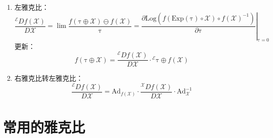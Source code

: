 \documentclass[12pt, onecolumn]{article}
\newcommand\normf{\fangsong}
\newcommand\Exp[1]{\mathrm{Exp}\left( #1\right) }
\newcommand\Log[1]{\mathrm{Log}\left( #1\right) }
\newcommand\bsm[1]{\boldsymbol{\mathrm{#1}}}
\begin{document}
\begin{enumerate}
\begin{enumerate}
	\item 左雅克比：
	\begin{equation}
	\frac{{^\mathcal{E}Df(\mathcal{X})}}{D\mathcal{X}}
	=\lim\frac{f(\bsm{\tau}\oplus\mathcal{X})\ominus f(\mathcal{X})}{\bsm{\tau}}
	=\left. \frac{\partial \Log{f(\Exp{\bsm\tau}\circ\mathcal{X})\circ f(\mathcal{X})^{-1}}}{\partial \bsm{\tau}}\right|_{\bsm{\tau}=0}
	\end{equation}
	更新：
	\begin{equation}
	f(\bsm{\tau}\oplus\mathcal{X})= \frac{{^\mathcal{E}Df(\mathcal{X})}}{D\mathcal{X}}\cdot{^{\mathcal{E}}\bsm{\tau}}
	\oplus f(\mathcal{X})
	\end{equation}
	
	\item 右雅克比转左雅克比：
	\begin{equation}
	\frac{{^\mathcal{E}Df(\mathcal{X})}}{D\mathcal{X}}=
	\bsm{Ad}_{f(\mathcal{X})}\cdot\frac{{^\mathcal{X}Df(\mathcal{X})}}{D\mathcal{X}}
	\cdot\bsm{Ad}_{\mathcal{X}}^{-1}
	\end{equation}
	\end{enumerate}
	\end{enumerate}
	
	\section{\normf 常用的雅克比}
\end{document}
